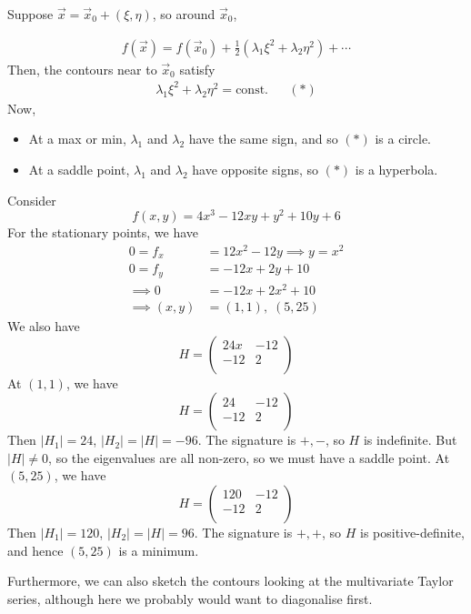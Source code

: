 \documentclass{../../template/note}
\begin{document}
    Suppose \(\vec x = \vec x_0 + (\xi, \eta)\), so around \(\vec x_0\),

    \begin{align*}
        f(\vec x) = f(\vec x_0) + \frac{1}{2}(\lambda_1 \xi^2 + \lambda_2 \eta^2) + \cdots
    \end{align*}
    Then, the contours near to \(\vec x_0\) satisfy
    \begin{align*}
        \lambda_1 \xi^2 + \lambda_2 \eta^2 = \text{const.} && (*)
    \end{align*}
    Now,
    \begin{itemize}
        \item At a max or min, \(\lambda_1\) and \(\lambda_2\) have the same sign, and so \((*)\) is a circle.
        \item At a saddle point, \(\lambda_1\) and \(\lambda_2\) have opposite signs, so \((*)\) is a hyperbola.
    \end{itemize}
    
    \begin{example}
        Consider
        \[
            f(x, y) = 4x^3-12xy+y^2+10y+6
        \]
        For the stationary points, we have
        \begin{align*}
            0 = f_x &= 12x^2-12y \implies y = x^2\\
            0 = f_y &= -12x+2y+10 \\
            \implies 0 &= -12x + 2x^2 + 10 \\
            \implies (x, y) &= (1, 1), \; (5, 25)
        \end{align*}
        We also have
        \[
            H = \begin{pmatrix}
             24x & -12 \\
             -12 & 2 \\
            \end{pmatrix}
        \]
        At \((1, 1)\), we have
        \[
            H = \begin{pmatrix}
             24 & -12 \\
             -12 & 2 \\
            \end{pmatrix}
        \]
        Then \(|H_1| = 24\), \(|H_2| = |H| = -96\). The signature is \(+, -\), so \(H\) is indefinite. But \(|H| \neq 0\), so the eigenvalues are all non-zero, so we must have a saddle point. At \((5, 25)\), we have
        \[
            H = \begin{pmatrix}
             120 & -12 \\
             -12 & 2 \\
            \end{pmatrix}
        \]
        Then \(|H_1| = 120\), \(|H_2| = |H| = 96\). The signature is \(+, +\), so \(H\) is positive-definite, and hence \((5, 25)\) is a minimum.

        Furthermore, we can also sketch the contours looking at the multivariate Taylor series, although here we probably would want to diagonalise first.
        
    \end{example}
\end{document}
